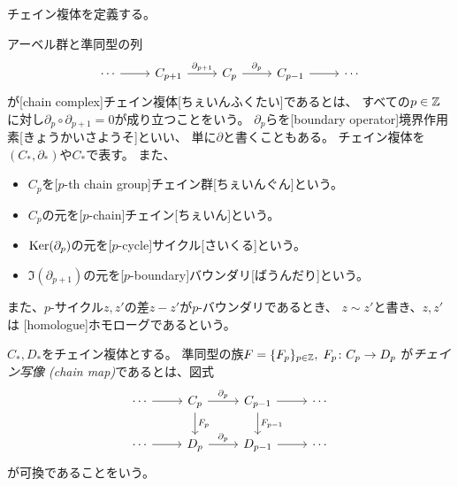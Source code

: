 \documentclass[report]{jlreq}
\begin{document}
チェイン複体を定義する。

\begin{definition}[チェイン複体]
    アーベル群と準同型の列
    \begin{equation}
        \begin{tikzcd}
            \cdots \ar{r}
            & C_{p+1} \ar{r}{\partial_{p+1}}
            & C_p \ar{r}{\partial_{p}}
            & C_{p-1} \ar{r}
            & \cdots
        \end{tikzcd}
    \end{equation}
    が[chain complex]{チェイン複体}[ちぇいんふくたい]であるとは、
    すべての$p \in \mathbb{Z}$に対し$\partial_{p} \circ \partial_{p+1} = 0$が成り立つことをいう。
    $\partial_p$らを[boundary operator]{境界作用素}[きょうかいさようそ]といい、
    単に$\partial$と書くこともある。
    チェイン複体を$(C_*, \partial_*)$や$C_*$で表す。
    また、
    \begin{itemize}
        \item $C_p$を[$p$-th chain group]{チェイン群}[ちぇいんぐん]という。
        \item $C_p$の元を[$p$-chain]{チェイン}[ちぇいん]という。
        \item $\operatorname{\mathrm{Ker}}(\partial_{p})$の元を[$p$-cycle]{サイクル}[さいくる]という。
        \item $\Im(\partial_{p+1})$の元を[$p$-boundary]{バウンダリ}[ばうんだり]という。
    \end{itemize}
    また、$p$-サイクル$z, z'$の差$z - z'$が$p$-バウンダリであるとき、
    $z \sim z'$と書き、$z, z'$は
    [homologue]{ホモローグ}であるという。
\end{definition}

\begin{definition}[チェイン写像]
    $C_*, D_*$をチェイン複体とする。
    準同型の族$F = \{F_p\}_{p \in \mathbb{Z}},\; F_p \colon C_p \to D_p$
    が\emph{チェイン写像 (chain map)}であるとは、図式
    \begin{equation}
        \begin{tikzcd}
            \cdots \ar{r}
            & C_p \ar{r}{\partial_{p}} \ar{d}{F_{p}}
            & C_{p-1} \ar{r} \ar{d}{F_{p-1}}
            & \cdots \\
            \cdots \ar{r}
            & D_p \ar{r}{\partial_{p}}
            & D_{p-1} \ar{r}
            & \cdots
        \end{tikzcd}
    \end{equation}
    が可換であることをいう。
\end{definition}
\end{document}
